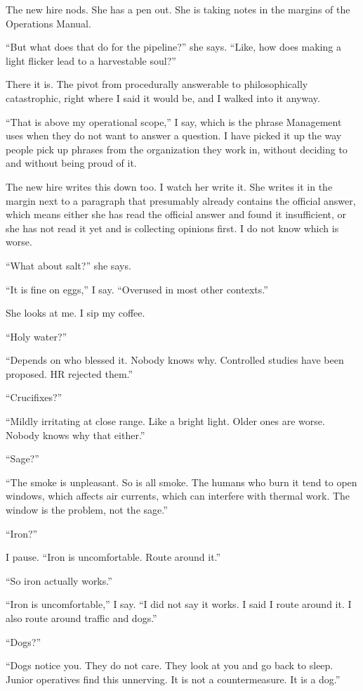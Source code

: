 The new hire nods. She has a pen out. She is taking notes in the margins of the Operations Manual.

``But what does that do for the pipeline?'' she says. ``Like, how does making a light flicker lead to a harvestable soul?''

There it is. The pivot from procedurally answerable to philosophically catastrophic, right where I said it would be, and I walked into it anyway.

``That is above my operational scope,'' I say, which is the phrase Management uses when they do not want to answer a question. I have picked it up the way people pick up phrases from the organization they work in, without deciding to and without being proud of it.

The new hire writes this down too. I watch her write it. She writes it in the margin next to a paragraph that presumably already contains the official answer, which means either she has read the official answer and found it insufficient, or she has not read it yet and is collecting opinions first. I do not know which is worse.

``What about salt?'' she says.

``It is fine on eggs,'' I say. ``Overused in most other contexts.''

She looks at me. I sip my coffee.

``Holy water?''

``Depends on who blessed it. Nobody knows why. Controlled studies have been proposed. HR rejected them.''

``Crucifixes?''

``Mildly irritating at close range. Like a bright light. Older ones are worse. Nobody knows why that either.''

``Sage?''

``The smoke is unpleasant. So is all smoke. The humans who burn it tend to open windows, which affects air currents, which can interfere with thermal work. The window is the problem, not the sage.''

``Iron?''

I pause. ``Iron is uncomfortable. Route around it.''

``So iron actually works.''

``Iron is uncomfortable,'' I say. ``I did not say it works. I said I route around it. I also route around traffic and dogs.''

``Dogs?''

``Dogs notice you. They do not care. They look at you and go back to sleep. Junior operatives find this unnerving. It is not a countermeasure. It is a dog.''


